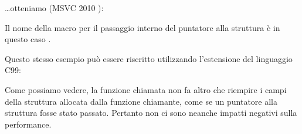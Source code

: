 \dots otteniamo (MSVC 2010 \Ox):



Il nome della macro per il passaggio interno del puntatore alla struttura è in questo caso .

Questo stesso esempio può essere riscritto utilizzando l'estensione del linguaggio C99:





Come possiamo vedere, la funzione chiamata non fa altro che riempire i campi della struttura allocata dalla funzione chiamante,
come se un puntatore alla struttura fosse stato passato.
Pertanto non ci sono neanche impatti negativi sulla performance.
